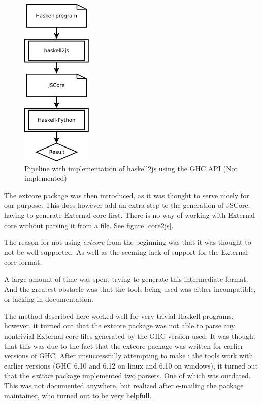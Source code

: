 \begin{figure}[H]
\begin{center}
\includegraphics[width=0.3\textwidth]{diags/pipe_w_haskell2js}
\caption[Pipeline without haskell2js]{Pipeline with implementation of haskell2js using the GHC API (Not implemented)}
\label{haskell2js}
\end{center}
\end{figure}

The extcore package was then introduced, as it was thought to serve nicely for our purpose. This
does however add an extra step to the generation of JSCore, having to generate External-core
first. There is no way of working with External-core without parsing it from a file. 
See figure \ref{core2js}.

The reason for not using \emph{extcore} from the beginning was that it was thought to not be
well supported. As well as the seeming lack of support for the External-core format.


A large amount of time was spent trying to generate this intermediate format. And the
greatest obstacle was that the tools being used was either incompatible, or lacking in
documentation.

The method described here worked well for very trivial Haskell programs, however, 
it turned out that
the extcore package was not able to parse any nontrivial External-core files generated 
by the GHC version used. It was thought that this was due to the fact that the extcore
package was written for earlier versions of GHC. After unsuccessfully attempting to make i
the tools work with earlier versions (GHC 6.10 and 6.12 on linux and 6.10 on windows), it
turned out that the \emph{extcore} package implemented two parsers. One of which was outdated.
This was not documented anywhere, but realized after e-mailing the package maintainer, who
turned out to be very helpfull.

